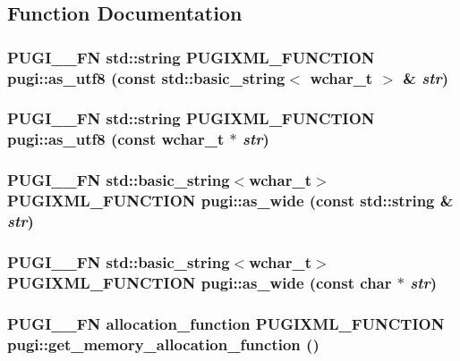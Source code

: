\subsection{Function Documentation}
\hypertarget{namespacepugi_ab4be9ab3dc86b13599b9f2fd2f778dfb}{
\subsubsection[{as\_\-utf8}]{\setlength{\rightskip}{0pt plus 5cm}PUGI\_\-\_\-FN std::string PUGIXML\_\-FUNCTION pugi::as\_\-utf8 (const std::basic\_\-string$<$ wchar\_\-t $>$ \& {\em str})}}
\label{namespacepugi_ab4be9ab3dc86b13599b9f2fd2f778dfb}
\hypertarget{namespacepugi_a390bb44f7ba92b1a8a4f9157799d2ca8}{
\subsubsection[{as\_\-utf8}]{\setlength{\rightskip}{0pt plus 5cm}PUGI\_\-\_\-FN std::string PUGIXML\_\-FUNCTION pugi::as\_\-utf8 (const wchar\_\-t $\ast$ {\em str})}}
\label{namespacepugi_a390bb44f7ba92b1a8a4f9157799d2ca8}
\hypertarget{namespacepugi_af33046c0db1ff7b3f63327d32fc6dca7}{
\subsubsection[{as\_\-wide}]{\setlength{\rightskip}{0pt plus 5cm}PUGI\_\-\_\-FN std::basic\_\-string$<$wchar\_\-t$>$ PUGIXML\_\-FUNCTION pugi::as\_\-wide (const std::string \& {\em str})}}
\label{namespacepugi_af33046c0db1ff7b3f63327d32fc6dca7}
\hypertarget{namespacepugi_ac2a9782a1c3c725703c6e4533e735d9b}{
\subsubsection[{as\_\-wide}]{\setlength{\rightskip}{0pt plus 5cm}PUGI\_\-\_\-FN std::basic\_\-string$<$wchar\_\-t$>$ PUGIXML\_\-FUNCTION pugi::as\_\-wide (const char $\ast$ {\em str})}}
\label{namespacepugi_ac2a9782a1c3c725703c6e4533e735d9b}
\hypertarget{namespacepugi_ab36e5aed4e5c952687b42d69daf981eb}{
\subsubsection[{get\_\-memory\_\-allocation\_\-function}]{\setlength{\rightskip}{0pt plus 5cm}PUGI\_\-\_\-FN allocation\_\-function PUGIXML\_\-FUNCTION pugi::get\_\-memory\_\-allocation\_\-function ()}}
